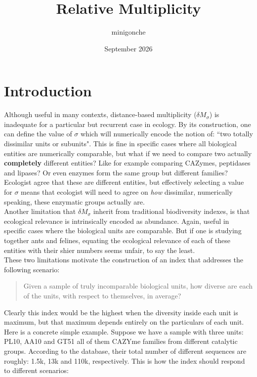 \documentclass{article}
\title{Relative Multiplicity}
\author{minigonche }
\date{September 2026}
\begin{document}
\maketitle

\section{Introduction}

Although useful in many contexts, distance-based multiplicity ($\delta M_\sigma$) is inadequate for a particular but recurrent case in ecology. By its construction, one can define the value of $\sigma$ which will numerically encode the notion of: ``two totally dissimilar units or subunits". This is fine in specific cases where all biological entities are numerically comparable, but what if we need to compare two actually \textbf{completely} different entities? Like for example comparing CAZymes, peptidases and lipases? Or even enzymes form the same group but different families? Ecologist agree that these are different entities, but effectively selecting a value for $\sigma$ means that ecologist will need to agree on \textit{how} dissimilar, numerically speaking, these enzymatic groups actually are. \\

Another limitation that $\delta M_\sigma$ inherit from traditional biodiversity indexes, is that ecological relevance is intrinsically encoded as abundance. Again, useful in specific cases where the biological units are comparable. But if one is studying together ants and felines, equating the ecological relevance of each of these entities with their shier numbers seems unfair, to say the least.\\

These two limitations motivate the construction of an index that addresses the following scenario:


\begin{quote}
Given a sample of truly incomparable biological units, how diverse are each of the units, with respect to themselves, in average?
\end{quote}

Clearly this index would be the highest when the diversity inside each unit is maximum, but that maximum depends entirely on the particulars of each unit. Here is a concrete simple example. Suppose we have a sample with three units: PL10, AA10 and GT51 all of them CAZYme families from different catalytic groups. According to the database, their total number of different sequences are roughly: 1.5k, 13k and 110k, respectively. This is how the index should respond to different scenarios:
\end{document}

